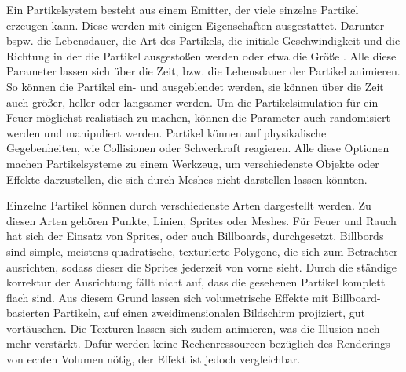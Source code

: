 Ein Partikelsystem besteht aus einem Emitter, der viele einzelne Partikel erzeugen kann. Diese werden mit einigen Eigenschaften ausgestattet. Darunter
bspw. die Lebensdauer, die Art des Partikels, die initiale Geschwindigkeit und die Richtung in der die Partikel ausgestoßen werden oder etwa die Größe \parencite{Reeves1983}.
Alle diese Parameter lassen sich über die Zeit, bzw. die Lebensdauer der Partikel animieren. 
So können die Partikel ein- und ausgeblendet werden, sie können über die Zeit auch größer, heller oder langsamer werden. 
Um die Partikelsimulation für ein Feuer möglichst realistisch zu machen, können die Parameter auch randomisiert werden und manipuliert werden.
Partikel können auf physikalische Gegebenheiten, wie Collisionen oder Schwerkraft reagieren. Alle diese Optionen machen Partikelsysteme zu einem 
Werkzeug, um verschiedenste Objekte oder Effekte darzustellen, die sich durch Meshes nicht darstellen lassen könnten. 

Einzelne Partikel können durch verschiedenste Arten dargestellt werden. Zu diesen Arten gehören Punkte, Linien, Sprites oder Meshes.
Für Feuer und Rauch hat sich der Einsatz von Sprites, oder auch Billboards, durchgesetzt. Billbords sind simple, meistens quadratische, texturierte Polygone,
die sich zum Betrachter ausrichten, sodass dieser die Sprites jederzeit von vorne sieht. Durch die ständige korrektur der Ausrichtung fällt
nicht auf, dass die gesehenen Partikel komplett flach sind. Aus diesem Grund lassen sich volumetrische Effekte mit Billboard-basierten Partikeln, 
auf einen zweidimensionalen Bildschirm projiziert, gut vortäuschen.  Die Texturen lassen sich zudem animieren, was die Illusion noch mehr verstärkt.  
Dafür werden keine Rechenressourcen bezüglich des Renderings von echten Volumen nötig, der Effekt ist jedoch vergleichbar.
